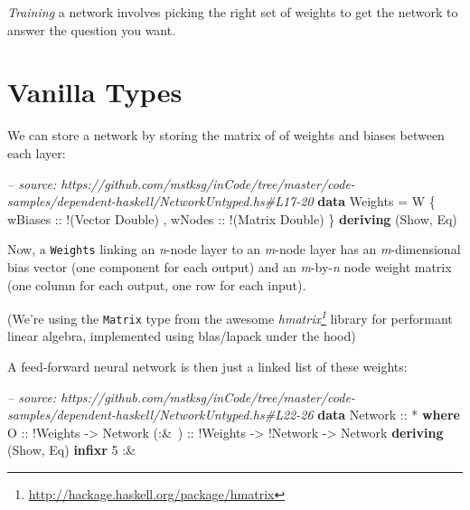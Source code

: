 \documentclass[]{article}
\newenvironment{Shaded}{}{}
\newcommand{\KeywordTok}[1]{\textcolor[rgb]{0.00,0.44,0.13}{\textbf{{#1}}}}
\newcommand{\DataTypeTok}[1]{\textcolor[rgb]{0.56,0.13,0.00}{{#1}}}
\newcommand{\DecValTok}[1]{\textcolor[rgb]{0.25,0.63,0.44}{{#1}}}
\newcommand{\CommentTok}[1]{\textcolor[rgb]{0.38,0.63,0.69}{\textit{{#1}}}}
\newcommand{\OtherTok}[1]{\textcolor[rgb]{0.00,0.44,0.13}{{#1}}}
\newcommand{\FunctionTok}[1]{\textcolor[rgb]{0.02,0.16,0.49}{{#1}}}
\newcommand{\NormalTok}[1]{{#1}}
\renewcommand{\href}[2]{#2\footnote{\url{#1}}}
\begin{document}
\emph{Training} a network involves picking the right set of weights to
get the network to answer the question you want.

\section{Vanilla Types}\label{vanilla-types}

We can store a network by storing the matrix of of weights and biases
between each layer:

\begin{Shaded}
\begin{Highlighting}[]
\CommentTok{-- source: https://github.com/mstksg/inCode/tree/master/code-samples/dependent-haskell/NetworkUntyped.hs#L17-20}
\KeywordTok{data} \DataTypeTok{Weights} \FunctionTok{=} \DataTypeTok{W} \NormalTok{\{}\OtherTok{ wBiases ::} \FunctionTok{!}\NormalTok{(}\DataTypeTok{Vector} \DataTypeTok{Double}\NormalTok{)}
                 \NormalTok{,}\OtherTok{ wNodes  ::} \FunctionTok{!}\NormalTok{(}\DataTypeTok{Matrix} \DataTypeTok{Double}\NormalTok{)}
                 \NormalTok{\}}
  \KeywordTok{deriving} \NormalTok{(}\DataTypeTok{Show}\NormalTok{, }\DataTypeTok{Eq}\NormalTok{)}
\end{Highlighting}
\end{Shaded}

Now, a \texttt{Weights} linking an \emph{n}-node layer to an
\emph{m}-node layer has an \emph{m}-dimensional bias vector (one
component for each output) and an \emph{m}-by-\emph{n} node weight
matrix (one column for each output, one row for each input).

(We're using the \texttt{Matrix} type from the awesome
\emph{\href{http://hackage.haskell.org/package/hmatrix}{hmatrix}}
library for performant linear algebra, implemented using blas/lapack
under the hood)

A feed-forward neural network is then just a linked list of these
weights:

\begin{Shaded}
\begin{Highlighting}[]
\CommentTok{-- source: https://github.com/mstksg/inCode/tree/master/code-samples/dependent-haskell/NetworkUntyped.hs#L22-26}
\KeywordTok{data} \DataTypeTok{Network}\OtherTok{ ::} \FunctionTok{*} \KeywordTok{where}
    \DataTypeTok{O}\OtherTok{     ::} \FunctionTok{!}\DataTypeTok{Weights} \OtherTok{->} \DataTypeTok{Network}
\OtherTok{    (:&~) ::} \FunctionTok{!}\DataTypeTok{Weights} \OtherTok{->} \FunctionTok{!}\DataTypeTok{Network} \OtherTok{->} \DataTypeTok{Network}
  \KeywordTok{deriving} \NormalTok{(}\DataTypeTok{Show}\NormalTok{, }\DataTypeTok{Eq}\NormalTok{)}
\KeywordTok{infixr} \DecValTok{5} \FunctionTok{:&~}
\end{Highlighting}
\end{Shaded}
\end{document}
